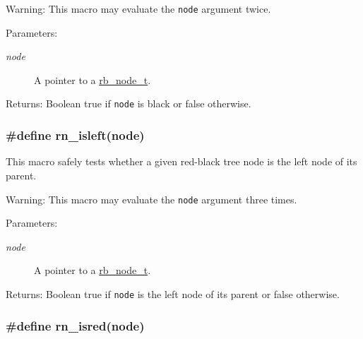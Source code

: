 \begin{Desc}
\item[Warning:]This macro may evaluate the {\tt node} argument twice.\end{Desc}
\begin{Desc}
\item[Parameters:]
\begin{description}
\item[{\em node}]A pointer to a \hyperlink{group__dbprim__rbtree_a1}{rb\_\-node\_\-t}.\end{description}
\end{Desc}
\begin{Desc}
\item[Returns:]Boolean true if {\tt node} is black or false otherwise. \end{Desc}
\hypertarget{group__dbprim__rbtree_a36}{
\subsubsection[rn\_\-isleft]{\setlength{\rightskip}{0pt plus 5cm}\#define rn\_\-isleft(node)}}
\label{group__dbprim__rbtree_a36}


This macro safely tests whether a given red-black tree node is the left node of its parent.

\begin{Desc}
\item[Warning:]This macro may evaluate the {\tt node} argument three times.\end{Desc}
\begin{Desc}
\item[Parameters:]
\begin{description}
\item[{\em node}]A pointer to a \hyperlink{group__dbprim__rbtree_a1}{rb\_\-node\_\-t}.\end{description}
\end{Desc}
\begin{Desc}
\item[Returns:]Boolean true if {\tt node} is the left node of its parent or false otherwise. \end{Desc}
\hypertarget{group__dbprim__rbtree_a35}{
\subsubsection[rn\_\-isred]{\setlength{\rightskip}{0pt plus 5cm}\#define rn\_\-isred(node)}}
\label{group__dbprim__rbtree_a35}



